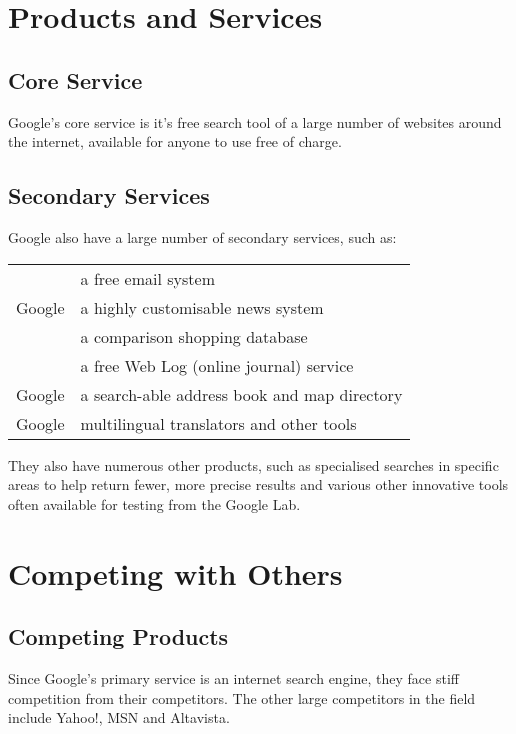 \documentclass[a4paper,12pt]{article}
\begin{document}
\section{Products and Services}

\subsection{Core Service}

Google's core service is it's free search tool of a large number of
websites around the internet, available for anyone to use free of 
charge.

\subsection{Secondary Services}

Google also have a large number of secondary services, such as:

\begin{tabular}{ll}
\cite[Gmail]{productdesc}	& a free email system 						\\ 
Google \cite[News]{productdesc}	& a highly customisable news system \\
\cite[Froogle]{productdesc}	&	 a comparison shopping database	\\
\cite[Blogger]{productdesc}	&	 a free Web Log (online journal) service \\
Google \cite[Maps]{productdesc}&	 a search-able address book and map directory \\
Google \cite[Language Tools]{productdesc}	&	 multilingual translators
and other tools	\\
\end{tabular}


They also have numerous other products, such as specialised searches in
specific areas to help return fewer, more precise results and various
other innovative tools often available for testing from the Google Lab. 

\section{Competing with Others}

\subsection{Competing Products}

Since Google's primary service is an internet search engine, they face
stiff competition from their competitors. The other large competitors in
the field include Yahoo!, MSN and Altavista.
\end{document}
